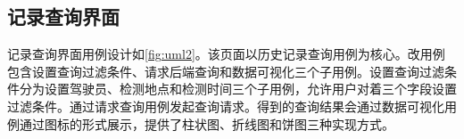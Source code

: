 



\subsection{记录查询界面}
记录查询界面用例设计如\ref{fig:uml2}。该页面以历史记录查询用例为核心。改用例包含设置查询过滤条件、请求后端查询和数据可视化三个子用例。设置查询过滤条件分为设置驾驶员、检测地点和检测时间三个子用例，允许用户对着三个字段设置过滤条件。通过请求查询用例发起查询请求。得到的查询结果会通过数据可视化用例通过图标的形式展示，提供了柱状图、折线图和饼图三种实现方式。

